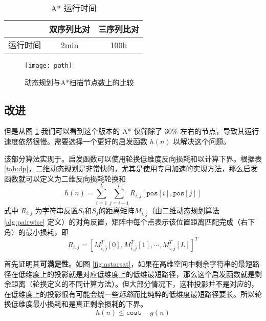     \begin{minipage}{0.5\textwidth}
        \begin{table}[H]
            \centering
            \caption{A* 运行时间}\label{tab:astar}
            \begin{tabular}{ccc}
                \toprule
                 & 双序列比对 & 三序列比对 \\
                \midrule
                运行时间 & 2min & 100h \\
                \bottomrule
            \end{tabular}
        \end{table}
    \end{minipage}
    \begin{minipage}{0.5\textwidth}
        \begin{figure}[H]
            \centering
            \texttt{[image: path]}
            \caption{动态规划与A*扫描节点数上的比较}\label{fig:path}
        \end{figure}
    \end{minipage}

    \subsection{改进}

    但是从图 \ref{fig:path} 我们可以看到这个版本的 A* 仅筛除了 30\% 左右的节点，导致其运行速度依然很慢。需要选择一个更好的启发函数 $h(n)$ 以解决这个问题。

    该部分算法实现于。启发函数可以使用轮换低维度反向损耗和以计算下界\cite{hastar}。根据表 \ref{tab:dp}，二维动态规划是非常快的，尤其是使用专用加速的实现方法，那么启发函数就可以定义为二维反向损耗轮换和
    \begin{equation*}
        h(n) = \sum_{i = 1}^L\sum_{j = i+1}^L R_{i,j}[\texttt{pos}[i],\texttt{pos}[j]]
    \end{equation*}
    式中 $R_{i,j}$ 为字符串反置$\overline{S_i}$和$\overline{S_j}$的距离矩阵$M_{\overline{i},\overline{j}}$（由二维动态规划算法 \ref{alg:pairwise} 定义）的对角反置，矩阵中每个点表示该位置距离匹配完成（右下角）的最小损耗，即
    \begin{equation*}
        R_{i,j} = [M_{\overline{i},\overline{j}}^T[0],M_{\overline{i},\overline{j}}^T[1],\cdots,M_{\overline{i},\overline{j}}^T[L]]^T
    \end{equation*}

    首先证明其\textbf{可满足性}。如图 \ref{fig:astarsat}，如果在高维空间中剩余字符串的最短路径在低维度上的投影就是对应低维度上的低维最短路径，那么这个启发函数就是剩余距离（轮换定义的不同计算方法）。但大部分情况下，这种投影并不是对应的，在低维度上的投影很有可能会绕一些\emph{远路}而比纯粹的低维度最短路径要长。所以轮换低维度最小损耗和是真正剩余损耗的下界。
    \begin{equation*}
        h(n)\leq \texttt{cost} - g(n)
    \end{equation*}


